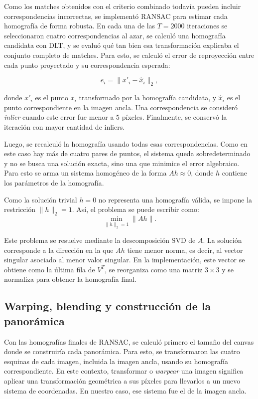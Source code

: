 \documentclass[a4paper,11pt]{article}
\begin{document}
Como los matches obtenidos con el criterio combinado todavía pueden incluir correspondencias incorrectas, se implementó RANSAC para estimar cada homografía de forma robusta. En cada una de las $T=2000$ iteraciones se seleccionaron cuatro correspondencias al azar, se calculó una homografía candidata con DLT, y se evaluó qué tan bien esa transformación explicaba el conjunto completo de matches. Para esto, se calculó el error de reproyección entre cada punto proyectado y su correspondencia esperada:

\[
e_i = \|x'_i - \hat{x}_i\|_2,
\]

donde \(x'_i\) es el punto \(x_i\) transformado por la homografía candidata, y \(\hat{x}_i\) es el punto correspondiente en la imagen ancla. Una correspondencia se consideró \textit{inlier} cuando este error fue menor a 5 píxeles. Finalmente, se conservó la iteración con mayor cantidad de inliers.

Luego, se recalculó la homografía usando todas esas correspondencias. Como en este caso hay más de cuatro pares de puntos, el sistema queda sobredeterminado y no se busca una solución exacta, sino una que minimice el error algebraico. Para esto se arma un sistema homogéneo de la forma \(Ah \approx 0\), donde \(h\) contiene los parámetros de la homografía.

Como la solución trivial \(h=0\) no representa una homografía válida, se impone la restricción \(\|h\|_2=1\). Así, el problema se puede escribir como:
\[
\min_{\|h\|_2=1} \|Ah\|.
\]

Este problema se resuelve mediante la descomposición SVD de \(A\). La solución corresponde a la dirección en la que \(Ah\) tiene menor norma, es decir, al vector singular asociado al menor valor singular. En la implementación, este vector se obtiene como la última fila de \(V^T\), se reorganiza como una matriz \(3\times3\) y se normaliza para obtener la homografía final.

\subsection*{Warping, blending y construcción de la panorámica}

Con las homografías finales de RANSAC, se calculó primero el tamaño del canvas donde se construiría cada panorámica. Para esto, se transformaron las cuatro esquinas de cada imagen, incluida la imagen ancla, usando su homografía correspondiente. En este contexto, transformar o \textit{warpear} una imagen significa aplicar una transformación geométrica a sus píxeles para llevarlos a un nuevo sistema de coordenadas. En nuestro caso, ese sistema fue el de la imagen ancla.
\end{document}
